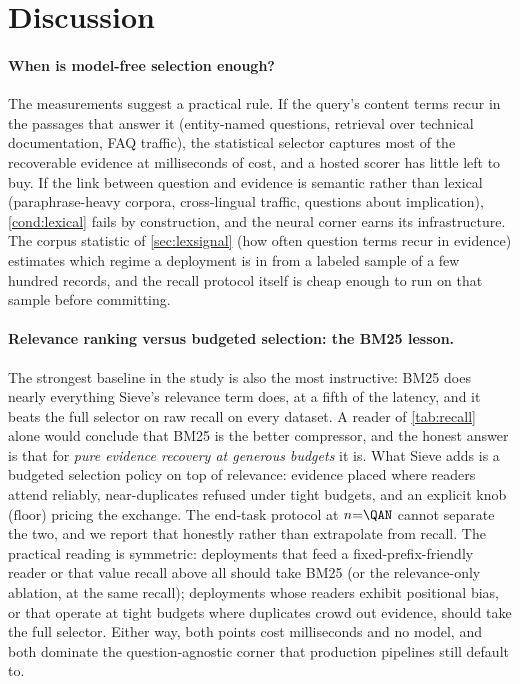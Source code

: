 \documentclass[review,12pt]{elsarticle}
\theoremstyle{remark}
\newcommand{\method}{Sieve}
\begin{document}
\section{Discussion}
\label{sec:discussion}

\paragraph{When is model-free selection enough?}
The measurements suggest a practical rule. If the query's content
terms recur in the passages that answer it (entity-named questions,
retrieval over technical documentation, FAQ traffic), the statistical
selector captures most of the recoverable evidence at milliseconds of
cost, and a hosted scorer has little left to buy. If the link between
question and evidence is semantic rather than lexical
(paraphrase-heavy corpora, cross-lingual traffic, questions about
implication), \autoref{cond:lexical} fails by construction, and the
neural corner earns its infrastructure. The corpus statistic of
\autoref{sec:lexsignal} (how often question terms recur in evidence)
estimates which regime a deployment is in from a labeled sample of a
few hundred records, and the recall protocol itself is cheap enough
to run on that sample before committing.

\paragraph{Relevance ranking versus budgeted selection: the BM25
lesson.}
The strongest baseline in the study is also the most instructive: BM25
does nearly everything \method{}'s relevance term does, at a fifth of
the latency, and it beats the full selector on raw recall on every
dataset. A reader of \autoref{tab:recall} alone would conclude that
BM25 is the better compressor, and the honest answer is that for
\emph{pure evidence recovery at generous budgets} it is. What
\method{} adds is a budgeted selection policy on top of relevance:
evidence placed where readers attend reliably, near-duplicates
refused under tight budgets, and an explicit knob
($\mathrm{floor}$) pricing the exchange. The end-task protocol at
$n{=}\QAN$ cannot separate the two, and we report that honestly rather
than extrapolate from recall. The practical reading is symmetric:
deployments that feed a fixed-prefix-friendly reader or that value
recall above all should take BM25 (or the relevance-only ablation, at
the same recall); deployments whose readers exhibit positional bias,
or that operate at tight budgets where duplicates crowd out evidence,
should take the full selector. Either way, both points cost
milliseconds and no model, and both dominate the question-agnostic
corner that production pipelines still default to.
\end{document}
